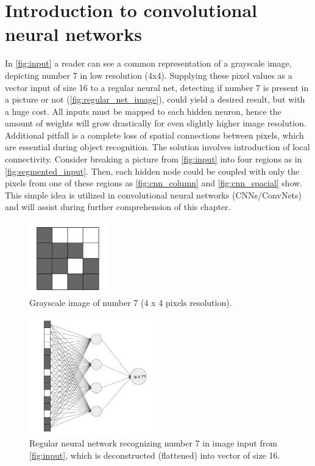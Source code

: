 \documentclass[11pt, a4paper]{article}
\begin{document}
\section{Introduction to convolutional neural networks} \label{introduction_to_cnns}
In \autoref{fig:input} a reader can see a common representation of a grayscale image, depicting number 7 in low resolution (4x4). Supplying these pixel values as a vector input of size 16 to a regular neural net, detecting if number 7 is present in a picture or not (\autoref{fig:regular_net_image}), could yield a desired result, but with a huge cost. All inputs must be mapped to each hidden neuron, hence the amount of weights will grow drastically for even slightly higher image resolution. Additional pitfall is a complete loss of spatial connections between pixels, which are essential during object recognition. The solution involves introduction of local connectivity. Consider breaking a picture from \autoref{fig:input} into four regions as in \autoref{fig:segmented_input}. Then, each hidden node could be coupled with only the pixels from one of these regions as \autoref{fig:cnn_column} and \autoref{fig:cnn_spacial} show. This simple idea is utilized in convolutional neural networks (CNNs/ConvNets) and will assist during further comprehension of this chapter.

\begin{figure}[h]
\includegraphics[width=0.3\textwidth]{input}
\centering
\caption[Obraz liczby 7]{Grayscale image of number 7 (4 x 4 pixels resolution).}
\label{fig:input}
\end{figure}

\begin{figure}[h]
\includegraphics[width=0.5\textwidth]{regular_net_image}
\centering
\caption[Prosta sieć neuronowa rozpoznająca liczbę 7]{Regular neural network recognizing number 7 in image input from \autoref{fig:input}, which is deconstructed (flattened) into vector of size 16.}
\label{fig:regular_net_image}
\end{figure}
\end{document}
